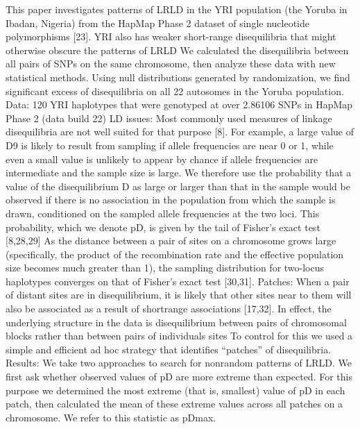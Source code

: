 This paper investigates patterns of LRLD in the YRI population (the Yoruba in Ibadan, Nigeria) from the HapMap Phase 2 dataset of single nucleotide polymorphisms [23]. YRI also has weaker short-range disequilibria that might otherwise obscure the patterns of LRLD \cite{koch2013long}
We calculated the disequilibria between all pairs of SNPs on the same chromosome, then analyze these data with new statistical methods.  \cite{koch2013long}
Using null distributions generated by randomization, we find significant excess of disequilibria on all 22 autosomes in the Yoruba population.  \cite{koch2013long}
Data: 120 YRI haplotypes that were genotyped at over 2.86106 SNPs in HapMap Phase 2 (data build 22) \cite{koch2013long}
LD issues: Most commonly used measures of linkage disequilibria are not well suited for that purpose [8]. For example, a large value of D9 is likely to result from sampling if allele frequencies are near 0 or 1, while even a small value is unlikely to appear by chance if allele frequencies are intermediate and the sample size is large. \cite{koch2013long}
We therefore use the probability that a value of the disequilibrium D as large or larger than that in the sample would be observed if there is no association in the population from which the sample is drawn, conditioned on the sampled allele frequencies at the two loci. This probability, which we denote pD, is given by the tail of Fisher's exact test [8,28,29] \cite{koch2013long}
As the distance between a pair of sites on a chromosome grows large (specifically, the product of the recombination rate and the effective population size becomes much greater than 1), the sampling distribution for two-locus haplotypes converges on that of Fisher's exact test [30,31].  \cite{koch2013long}
Patches: When a pair of distant sites are in disequilibrium, it is likely that other sites near to them will also be associated as a result of shortrange associations [17,32]. In effect, the underlying structure in the data is disequilibrium between pairs of chromosomal blocks rather than between pairs of individuals sites \cite{koch2013long}
To control for this we used a simple and efficient ad hoc strategy that identifies ``patches'' of disequilibria. \cite{koch2013long}
Results: We take two approaches to search for nonrandom patterns of LRLD. We first ask whether observed values of pD are more extreme than expected. For this purpose we determined the most extreme (that is, smallest) value of pD in each patch, then calculated the mean of these extreme values across all patches on a chromosome. We refer to this statistic as pDmax.  \cite{koch2013long}
